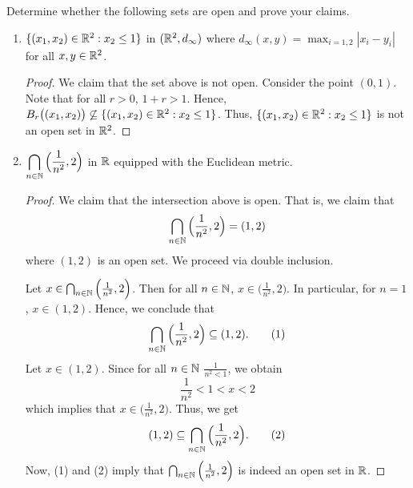 \documentclass[a4paper]{article}
\begin{document}
\begin{problem}
   Determine whether the following sets are open and prove your claims. 
   \begin{enumerate}
       \item[(i)] \( \{ ({x}_{1}, {x}_{2}) \in \mathbb{R}^{2} : {x}_{2} \leq 1  \}   \) in \( (\mathbb{R}^{2}, {d}_{\infty })  \) where \( {d}_{\infty }(x,y) = \max_{i = 1,2} | {x}_{i} - {y}_{i} |   \) for all \( x,y \in \mathbb{R}^{2} \).
           \begin{proof}
           We claim that the set above is not open. Consider the point \( (0,1) \). Note that for all \( r > 0  \), \( 1 + r > 1  \). Hence, \( {B}_{r}\big(({x}_{1}, {x}_{2})\big) \not\subseteq \{ ({x}_{1}, {x}_{2}) \in \mathbb{R}^{2} : {x}_{2} \leq 1  \}  \). Thus, \( \{ ({x}_{1}, {x}_{2}) \in \mathbb{R}^{2} : {x}_{2} \leq 1  \}  \) is not an open set in \( \mathbb{R}^{2} \).
           \end{proof}
        \item[(ii)] \(  \displaystyle \bigcap_{ n \in \mathbb{N}  }^{  }  \Big( \frac{ 1 }{ n^{2}  }  , 2  \Big) \) in \( \mathbb{R}  \) equipped with the Euclidean metric.
            \begin{proof}
            We claim that the intersection above is open. That is, we claim that 
            \[  \bigcap_{ n \in \mathbb{N}  }^{  }  \Big( \frac{ 1 }{ n^{2} } , 2  \Big) = (1,2) \]
            where \( (1,2) \) is an open set. We proceed via double inclusion. 

            Let \( x \in \bigcap_{ n \in \mathbb{N}  }^{  }  \Big( \frac{ 1 }{ n^{2} } , 2  \Big) \). Then for all \( n \in \mathbb{N}  \), \( x \in \Big( \frac{ 1 }{ n^{2} }  , 2  \Big) \). In particular, for  \( n = 1  \), \( x \in (1 , 2 ) \). Hence, we conclude that 
            \[  \bigcap_{ n \in \mathbb{N}  }^{}   \Big( \frac{ 1 }{ n^{2} } , 2  \Big) \subseteq (1,2). \tag{1}  \]
            Let \( x \in (1,2) \). Since for all \( n \in \mathbb{N}  \) \( \frac{ 1 }{ n^{2} < 1  }  \), we obtain
            \[  \frac{ 1 }{ n^{2} }  < 1 < x < 2  \]
            which implies that \( x \in \Big( \frac{ 1 }{ n^{2} } , 2  \Big) \). Thus, we get
            \[  (1,2) \subseteq \bigcap_{ n \in \mathbb{N}  }^{  }  \Big( \frac{ 1 }{ n^{2} }  ,2  \Big). \tag{2} \]
            Now, (1) and (2) imply that \( \bigcap_{ n \in \mathbb{N}  }^{  }  \Big( \frac{ 1 }{ n^{2} } , 2  \Big) \) is indeed an open set in \( \mathbb{R}  \).
            \end{proof}
   \end{enumerate}
\end{problem}
\end{document}

